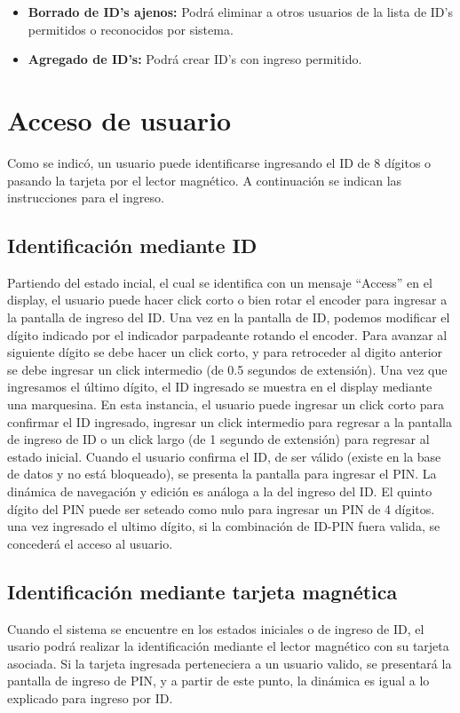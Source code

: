 \documentclass[10pt,a4paper]{article}
\begin{document}
\begin{itemize}
\item \textbf{Borrado de ID's ajenos: } Podrá eliminar a otros usuarios de la lista de ID's permitidos o reconocidos por sistema.
\item \textbf{Agregado de ID's: } Podrá crear ID's con ingreso permitido.

\end{itemize}

\section{Acceso de usuario}
Como se indicó, un usuario puede identificarse ingresando el ID de 8 dígitos o pasando la tarjeta por el lector magnético. A continuación se indican las instrucciones para el ingreso.
\subsection{Identificación mediante ID}
Partiendo del estado incial, el cual se identifica con un mensaje ``Access'' en el display, el usuario puede hacer click corto o bien rotar el encoder para ingresar a la pantalla de ingreso del ID. Una vez en la pantalla de ID, podemos modificar el dígito indicado por el indicador parpadeante rotando el encoder. Para avanzar al siguiente dígito se debe hacer un click corto, y para retroceder al digito anterior se debe ingresar un click intermedio (de 0.5 segundos de extensión). Una vez que ingresamos el último dígito, el ID ingresado se muestra en el display mediante una marquesina. En esta instancia, el usuario puede ingresar un click corto para confirmar el ID ingresado, ingresar un click intermedio para regresar a la pantalla de ingreso de ID o un click largo (de 1 segundo de extensión) para regresar al estado inicial. Cuando el usuario confirma el ID, de ser v\'alido (existe en la base de datos y no est\'a bloqueado), se presenta la pantalla para ingresar el PIN. La dinámica de navegación y edición es análoga a la del ingreso del ID. El quinto dígito del PIN puede ser seteado como nulo para ingresar un PIN de 4 dígitos. una vez ingresado el ultimo dígito, si la combinación de ID-PIN fuera valida, se concederá el acceso al usuario. 

\subsection{Identificación mediante tarjeta magnética}
Cuando el sistema se encuentre en los estados iniciales o de ingreso de ID, el usario podrá realizar la identificación mediante el lector magn\'etico con su tarjeta asociada. Si la tarjeta ingresada perteneciera a un usuario valido, se presentará la pantalla de ingreso de PIN, y a partir de este punto, la dinámica es igual a lo explicado para ingreso por ID. 
\end{document}
